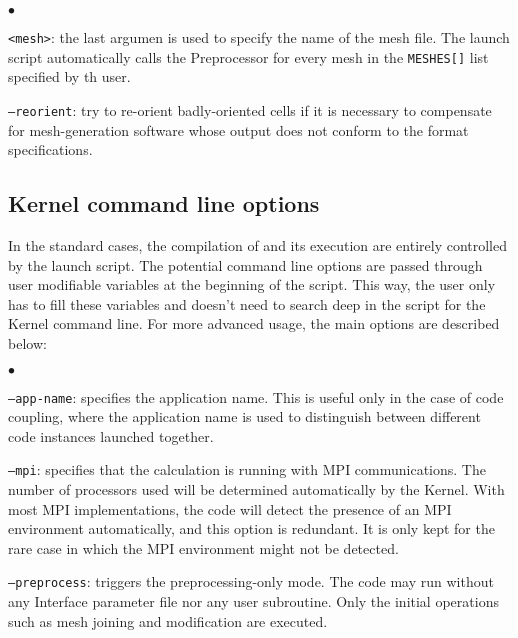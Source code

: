 {{{\begin{list}{$\bullet$}{}
\item \texttt{<mesh>}: the last argumen is used to specify the name of the mesh file.
The launch script automatically calls the Preprocessor for every
mesh in the \texttt{MESHES[]} list specified by th user.

\item \texttt{--reorient}: try to re-orient badly-oriented cells
if it is necessary to compensate for mesh-generation software
whose output does not conform to the format specifications.

\end{list}

\subsection{Kernel command line options}
\label{prg_optappelnoy}%
In the standard cases, the compilation of \CS and its execution are entirely
controlled by the launch script. The potential command line options are passed
through user modifiable variables at the beginning of the script. This way, the
user only has to fill these variables and doesn't need
to search deep in the script for the Kernel command line. For more advanced
usage, the main options are described below:

\begin{list}{$\bullet$}{}
\item \texttt{--app-name}: specifies the application name. This is
useful only in the case of code coupling, where the application name
is used to distinguish between different code instances launched together.

\item \texttt{--mpi}: specifies that the calculation is running
with MPI communications. The number of processors used will be determined
automatically by the Kernel. With most MPI implementations, the
code will detect the presence of an MPI environment automatically, and
this option is redundant. It is only kept for the rare case in which the
MPI environment might not be detected.

\item \texttt{--preprocess}: triggers the preprocessing-only mode.
The code may run without any Interface parameter file nor any user subroutine.
Only the initial operations such as mesh joining and modification are
executed.


\end{list}}}}
